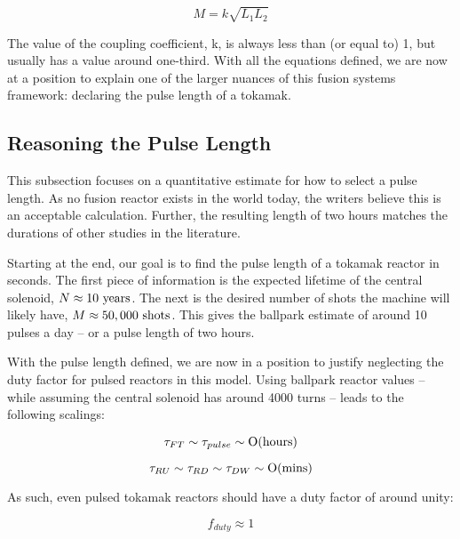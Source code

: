 \begin{equation}
	M = k \sqrt{ L_1 L_2 }
\end{equation}

The value of the coupling coefficient, k, is always less than (or equal to) 1, but usually has a value around one-third. With all the equations defined, we are now at a position to explain one of the larger nuances of this fusion systems framework: declaring the pulse length of a tokamak.

\subsection{Reasoning the Pulse Length}

\label{section:pulse}

This subsection focuses on a quantitative estimate for how to select a pulse length. As no fusion reactor exists in the world today, the writers believe this is an acceptable calculation. Further, the resulting length of two hours matches the durations of other studies in the literature.

Starting at the end, our goal is to find the pulse length of a tokamak reactor in seconds.  The first piece of information is the expected lifetime of the central solenoid, $ N \approx 10 \ \textnormal{years} $. The next is the desired number of shots the machine will likely have, $ M \approx 50,000 \ \textnormal{shots} $. This gives the ballpark estimate of around 10 pulses a day -- or a pulse length of two hours.

With the pulse length defined, we are now in a position to justify neglecting the duty factor for pulsed reactors in this model. Using ballpark reactor values -- while assuming the central solenoid has around 4000 turns -- leads to the following scalings:

\begin{equation}
	\tau_{FT} \sim \tau_{pulse} \sim \textnormal{O(hours)}
\end{equation}

\begin{equation}
	\tau_{RU} \sim \tau_{RD} \sim \tau_{DW} \sim \textnormal{O(mins)}
\end{equation}

As such, even pulsed tokamak reactors should have a duty factor of around unity:

\begin{equation}
	f_{duty} \approx 1
\end{equation}

